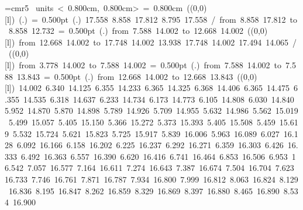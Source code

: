 \font\thinlinefont=cmr5
\mbox{\beginpicture
\setcoordinatesystem units < 0.800cm, 0.800cm>
\unitlength= 0.800cm
\linethickness=1pt
\setplotsymbol ({\makebox(0,0)[l]{\tencirc{}}})
\setshadesymbol ({\thinlinefont .})
\setlinear
%
%
\linethickness= 0.500pt
\setplotsymbol ({\thinlinefont .})
%
%
 17.558  8.858 17.812  8.795 17.558 /
%
\putrule from  8.858 17.812 to  8.858 12.732
%
%
\linethickness= 0.500pt
\setplotsymbol ({\thinlinefont .})
\putrule from  7.588 14.002 to 12.668 14.002
%
%
\linethickness=1pt
\setplotsymbol ({\makebox(0,0)[l]{\tencirc{}}})
\putrule from 12.668 14.002 to 17.748 14.002
%
%
 13.938 17.748 14.002 17.494 14.065 /
%
%
%
\linethickness=1pt
\setplotsymbol ({\makebox(0,0)[l]{\tencirc{}}})
\putrule from  3.778 14.002 to  7.588 14.002
%
%
\linethickness= 0.500pt
\setplotsymbol ({\thinlinefont .})
\putrule from  7.588 14.002 to  7.588 13.843
%
%
\linethickness= 0.500pt
\setplotsymbol ({\thinlinefont .})
\putrule from 12.668 14.002 to 12.668 13.843
\linethickness=1pt
\setplotsymbol ({\makebox(0,0)[l]{\tencirc{}}})
%
%
 14.002      6.340 14.125
         6.355 14.233
         6.365 14.325
         6.368 14.406
         6.365 14.475
         6.355 14.535
         6.318 14.637
         6.233 14.734
         6.173 14.773
         6.105 14.808
         6.030 14.840
         5.952 14.870
         5.870 14.898
         5.789 14.926
         5.709 14.955
         5.632 14.986
         5.562 15.019
         5.499 15.057
         5.405 15.150
         5.366 15.272
         5.373 15.393
         5.405 15.508
         5.459 15.619
         5.532 15.724
         5.621 15.823
         5.725 15.917
         5.839 16.006
         5.963 16.089
         6.027 16.128
         6.092 16.166
         6.158 16.202
         6.225 16.237
         6.292 16.271
         6.359 16.303
         6.426 16.333
         6.492 16.363
         6.557 16.390
         6.620 16.416
         6.741 16.464
         6.853 16.506
         6.953 16.542
         7.057 16.577
         7.164 16.611
         7.274 16.643
         7.387 16.674
         7.504 16.704
         7.623 16.733
         7.746 16.761
         7.871 16.787
         7.934 16.800
         7.999 16.812
         8.063 16.824
         8.129 16.836
         8.195 16.847
         8.262 16.859
         8.329 16.869
         8.397 16.880
         8.465 16.890
         8.534 16.900
}
